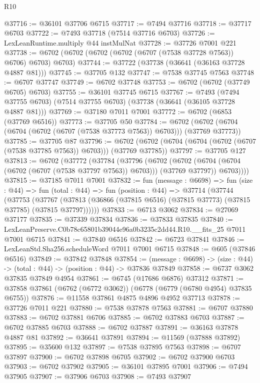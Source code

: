 \begin{lexlean}{R10}
\begin{coremodule}
@37716 := @36101 @37706 @6715
@37717 := @7494 @37716
@37718 := @37717 @6703
@37722 := @7493 @37718 (@7514 @37716 @6703)
@37726 := LexLeanRuntime.multiply @44 instMulNat
@37728 := @37726 @7001 @221
@37738 := @6702 (@6702 (@6702 (@6702 (@6707 (@7538 @37728 @7563)) @6706) @6703) @6703)
@37744 := @37722 (@37738 (@36641 (@36163 @37728 @4887 @81)))
@37745 := @37705 @132
@37747 := @7538 @37745 @7563
@37748 := @6707 @37747
@37749 := @6702 @37748
@37753 := @6702 (@6702 (@37749 @6705) @6703)
@37755 := @36101 @37745 @6715
@37767 := @7493
    (@7494 @37755 @6703)
    (@7514 @37755 @6703)
    (@37738 (@36641 (@36105 @37728 @4887 @81)))
@37769 := @37180 @7011 @7001
@37772 := @6702 (@6853 (@37769 @6516))
@37773 := @37705 @50
@37784 := @6702 (@6702 (@6704 (@6704 (@6702 (@6707 (@7538 @37773 @7563)) @6703))) (@37769 @37773))
@37785 := @37705 @87
@37796 := @6702 (@6702 (@6704 (@6704 (@6702 (@6707 (@7538 @37785 @7563)) @6703))) (@37769 @37785))
@37797 := @37705 @127
@37813 := @6702
    (@37772
      (@37784
        (@37796
          (@6702
            (@6702 (@6704 (@6704 (@6702 (@6707 (@7538 @37797 @7563)) @6703))) (@37769 @37797))
            @6703))))
@37815 := @37185 @7011 @7001
@37832 := fun (message : @6698) =>
  fun (size : @44) =>
  fun (total : @44) =>
  fun (position : @44) =>
  @37714
    (@37744
      (@37753
        (@37767 (@37813 (@36866 (@37815 @6516) (@37815 @37773) (@37815 @37785) (@37815 @37797))))))
@37833 := @6713 @3062
@37834 := @27069 @37177
@37835 := @37339 @37834
@37836 := @37833 @37835
@37840 := LexLeanPreserve.C0b78c65801b39044e96a0b3235c2dd44.R10.__fits_25 @7011 @7001 @6715
@37841 := @37840 @6516
@37842 := @6723 @37841
@37846 := LexLeanStd.Sha256.scheduleWord @7011 @7001 @6715
@37848 := @605 (@37846 @6516)
@37849 := @37842 @37848
@37854 := (message : @6698) -> (size : @44) -> (total : @44) -> (position : @44) -> @37836 @37849
@37858 := @6737 @3062 @37835 @37849 @4954
@37861 := @6745 (@17686 @6876) @37312
@37871 := @37858 @37861 (@6762 (@6772 @3062)) (@6778 (@6779 (@6780 @4954) @37835 @6755))
@37876 := @11558 @37861 @4875 @4896 @4952 @37713
@37878 := @37726 @7011 @221
@37880 := @7538 @37878 @7563
@37881 := @6707 @37880
@37883 := @6702 @37881 @6706
@37885 := @6702 @37883 @6703
@37887 := @6702 @37885 @6703
@37888 := @6702 @37887
@37891 := @36163 @37878 @4887 @81
@37892 := @36641 @37891
@37894 := @11569 (@37888 @37892)
@37895 := @35600 @132
@37897 := @7538 @37895 @7563
@37898 := @6707 @37897
@37900 := @6702 @37898 @6705
@37902 := @6702 @37900 @6703
@37903 := @6702 @37902
@37905 := @36101 @37895 @7001
@37906 := @7494 @37905
@37907 := @37906 @6703
@37908 := @7493 @37907

\end{coremodule}
\end{lexlean}
